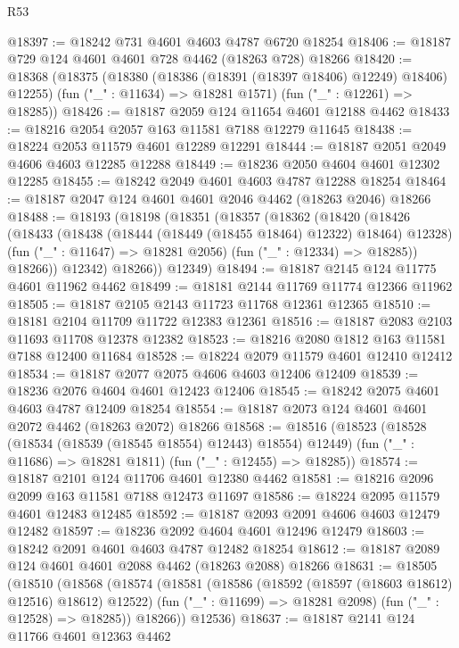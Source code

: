 \begin{lexlean}{R53}
\begin{coremodule}
@18397 := @18242 @731 @4601 @4603 @4787 @6720 @18254
@18406 := @18187 @729 @124 @4601 @4601 @728 @4462 (@18263 @728) @18266
@18420 := @18368
    (@18375
      (@18380 (@18386 (@18391 (@18397 @18406) @12249) @18406) @12255)
      (fun ("_" : @11634) => @18281 @1571)
      (fun ("_" : @12261) => @18285))
@18426 := @18187 @2059 @124 @11654 @4601 @12188 @4462
@18433 := @18216 @2054 @2057 @163 @11581 @7188 @12279 @11645
@18438 := @18224 @2053 @11579 @4601 @12289 @12291
@18444 := @18187 @2051 @2049 @4606 @4603 @12285 @12288
@18449 := @18236 @2050 @4604 @4601 @12302 @12285
@18455 := @18242 @2049 @4601 @4603 @4787 @12288 @18254
@18464 := @18187 @2047 @124 @4601 @4601 @2046 @4462 (@18263 @2046) @18266
@18488 := @18193
    (@18198
      (@18351
        (@18357
          (@18362
            (@18420
              (@18426
                (@18433
                  (@18438 (@18444 (@18449 (@18455 @18464) @12322) @18464) @12328)
                  (fun ("_" : @11647) => @18281 @2056)
                  (fun ("_" : @12334) => @18285))
                @18266))
            @12342)
          @18266))
      @12349)
@18494 := @18187 @2145 @124 @11775 @4601 @11962 @4462
@18499 := @18181 @2144 @11769 @11774 @12366 @11962
@18505 := @18187 @2105 @2143 @11723 @11768 @12361 @12365
@18510 := @18181 @2104 @11709 @11722 @12383 @12361
@18516 := @18187 @2083 @2103 @11693 @11708 @12378 @12382
@18523 := @18216 @2080 @1812 @163 @11581 @7188 @12400 @11684
@18528 := @18224 @2079 @11579 @4601 @12410 @12412
@18534 := @18187 @2077 @2075 @4606 @4603 @12406 @12409
@18539 := @18236 @2076 @4604 @4601 @12423 @12406
@18545 := @18242 @2075 @4601 @4603 @4787 @12409 @18254
@18554 := @18187 @2073 @124 @4601 @4601 @2072 @4462 (@18263 @2072) @18266
@18568 := @18516
    (@18523
      (@18528 (@18534 (@18539 (@18545 @18554) @12443) @18554) @12449)
      (fun ("_" : @11686) => @18281 @1811)
      (fun ("_" : @12455) => @18285))
@18574 := @18187 @2101 @124 @11706 @4601 @12380 @4462
@18581 := @18216 @2096 @2099 @163 @11581 @7188 @12473 @11697
@18586 := @18224 @2095 @11579 @4601 @12483 @12485
@18592 := @18187 @2093 @2091 @4606 @4603 @12479 @12482
@18597 := @18236 @2092 @4604 @4601 @12496 @12479
@18603 := @18242 @2091 @4601 @4603 @4787 @12482 @18254
@18612 := @18187 @2089 @124 @4601 @4601 @2088 @4462 (@18263 @2088) @18266
@18631 := @18505
    (@18510
      (@18568
        (@18574
          (@18581
            (@18586 (@18592 (@18597 (@18603 @18612) @12516) @18612) @12522)
            (fun ("_" : @11699) => @18281 @2098)
            (fun ("_" : @12528) => @18285))
          @18266))
      @12536)
@18637 := @18187 @2141 @124 @11766 @4601 @12363 @4462

\end{coremodule}
\end{lexlean}
